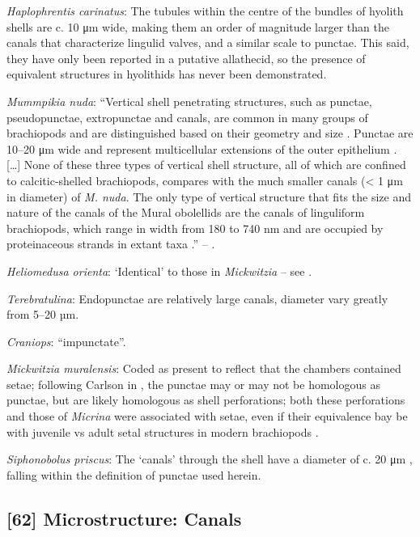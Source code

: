 \documentclass[]{book}
\theoremstyle{definition}
\theoremstyle{definition}
\theoremstyle{definition}
\theoremstyle{remark}
\begin{document}
\emph{Haplophrentis carinatus}: The tubules within the centre of the
bundles of hyolith shells \citep{Kouchinsky2000Skeletalmicrostructures}
are c. 10 μm wide, making them an order of magnitude larger than the
canals that characterize lingulid valves, and a similar scale to
punctae. This said, they have only been reported in a putative
allathecid, so the presence of equivalent structures in hyolithids has
never been demonstrated.

\emph{Mummpikia nuda}: ``Vertical shell penetrating structures, such as
punctae, pseudopunctae, extropunctae and canals, are common in many
groups of brachiopods and are distinguished based on their geometry and
size \citep{Williams1997BrachiopodaRevised}. Punctae are 10--20 μm wide
and represent multicellular extensions of the outer epithelium
\citep{Owen1969Thecaecum}. {[}\ldots{}{]} None of these three types of
vertical shell structure, all of which are confined to calcitic-shelled
brachiopods, compares with the much smaller canals (\textless{} 1 μm in
diameter) of \emph{M. nuda}. The only type of vertical structure that
fits the size and nature of the canals of the Mural obolellids are the
canals of linguliform brachiopods, which range in width from 180 to 740
nm and are occupied by proteinaceous strands in extant taxa
\citetext{\citealp[1994]{Williams1992Structureof}; \citealp{Williams1997BrachiopodaRevised}}.''
-- \citet{Balthasar2008iMummpikia}.

\emph{Heliomedusa orienta}: `Identical' to those in \emph{Mickwitzia} --
see \citet{Williams2007PartH}.

\emph{Terebratulina}: Endopunctae are relatively large canals, diameter
vary greatly from 5--20 µm.

\emph{Craniops}: ``impunctate''.

\emph{Mickwitzia muralensis}: Coded as present to reflect that the
chambers contained setae; following Carlson in
\citet{Williams2007PartH}, the punctae may or may not be homologous as
punctae, but are likely homologous as shell perforations; both these
perforations and those of \emph{Micrina} were associated with setae,
even if their equivalence bay be with juvenile vs adult setal structures
in modern brachiopods \citep[p.~397]{Balthasar2004Shellstructure}.

\emph{Siphonobolus priscus}: The `canals' through the shell have a
diameter of c. 20 μm \citep[text-fig. 2a]{Williams2004Chemicostructure},
falling within the definition of punctae used herein.

\hypertarget{microstructure-canals}{%
\subsection*{{[}62{]} Microstructure:
Canals}\label{microstructure-canals}}
\end{document}
